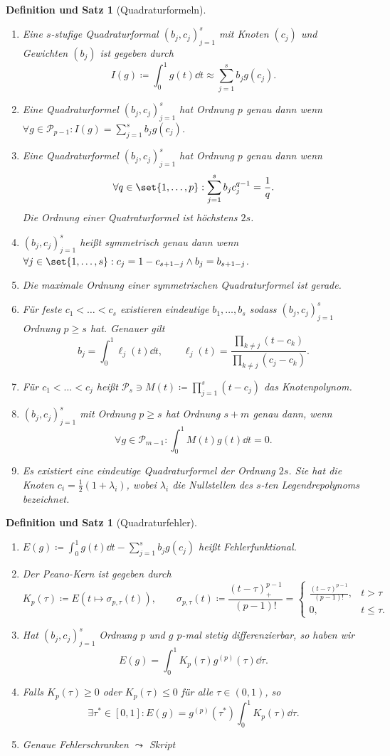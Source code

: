 \documentclass[a4paper]{article}
\theoremstyle{marginbreak}
\newtheorem{defsatz}[definition]{Definition und Satz}
\newcommand\defas\coloneqq
\newcommand\qf{(b_j, c_j)_{j=1}^s}
\newcommand\poly{\mathcal{P}}
\newcommand\qs{\sum_{j=1}^sb_jg(c_j)}
\begin{document}
	\begin{defsatz}[Quadraturformeln]
		\begin{enumerate}[label=(\alph*)]
			\item
				Eine $s$-stufige Quadraturformal $\qf$ mit Knoten $(c_j)$ und Gewichten $(b_j)$ ist gegeben durch
				\[
					I(g) \defas \int_0^1g(t)\dd{t}\approx\qs.
				\]
			\item
				Eine Quadraturformel $\qf$ hat Ordnung $p$ genau dann wenn $\forall g\in\poly_{p-1}: I(g) = \qs$.
			\item
				Eine Quadraturformel $\qf$ hat Ordnung $p$ genau dann wenn
				\[
					\forall q\in\set{1,\ldots,p}: \sum_{j=1}^s b_j c_j^{q-1} = \frac{1}{q}.
				\]
				Die Ordnung einer Quatraturformel ist höchstens $2s$.
			\item $\qf$ heißt symmetrisch genau dann wenn $\forall j\in\set{1,\ldots,s}: c_j=1-c_{s+1-j}\wedge b_j=b_{s+1-j}$.
			\item Die maximale Ordnung einer symmetrischen Quadraturformel ist gerade.
			\item Für feste $c_1<\dots<c_s$ existieren eindeutige $b_1,\ldots, b_s$ sodass $\qf$ Ordnung $p\geq s$ hat. Genauer gilt
				\[
					b_j=\int_0^1\ell_j(t)\dd{t}, \qquad
					\ell_j(t) = \frac{\prod_{k\neq j}(t-c_k)}{\prod_{k\neq j}(c_j-c_k)}.
				\]
			\item Für $c_1<\dots<c_j$ heißt $\poly_s\ni M(t)\defas \prod_{j=1}^s (t-c_j)$ das Knotenpolynom.
			\item $\qf$ mit Ordnung $p\geq s$ hat Ordnung $s+m$ genau dann, wenn
			\[
				\forall g\in\poly_{m-1}: \int_0^1 M(t)g(t)\dd{t}=0.
			\]
			\item Es existiert eine eindeutige Quadraturformel der Ordnung $2s$. Sie hat die
				Knoten $c_i = \frac{1}{2}(1+\lambda_i)$, wobei $\lambda_i$ die Nullstellen des $s$-ten
				Legendrepolynoms bezeichnet.
		\end{enumerate}
	\end{defsatz}
	\begin{defsatz}[Quadraturfehler]
		\begin{enumerate}[label=(\alph*)]
			\item $E(g)\defas \int_0^1g(t)\dd{t}-\qs$ heißt Fehlerfunktional.
			\item Der Peano-Kern ist gegeben durch
			\[
				K_p(\tau)\defas E(t\mapsto \sigma_{p,\tau}(t)), \qquad \sigma_{p,\tau}(t)\defas\frac{(t-\tau)^{p-1}_+}{(p-1)!}=
				\begin{cases}
					\frac{(t-\tau)^{p-1}}{(p-1)!}, &t>\tau\\
					0, &t\leq\tau.
				\end{cases}
			\]
			\item Hat $\qf$ Ordnung $p$ und $g$ $p$-mal stetig differenzierbar, so haben wir
			\[
				E(g)=\int_0^1 K_p(\tau)g^{(p)}(\tau)\dd{\tau}.
			\]
			\item Falls $K_p(\tau)\geq 0$ oder $K_p(\tau)\leq 0$ für alle $\tau\in(0, 1)$, so
			\[
				\exists\tau^*\in[0, 1]:E(g) = g^{(p)}(\tau^*)\int_0^1K_p(\tau)\dd{\tau}.
			\]
			\item Genaue Fehlerschranken $\leadsto$ Skript
		\end{enumerate}
	\end{defsatz}
\end{document}
